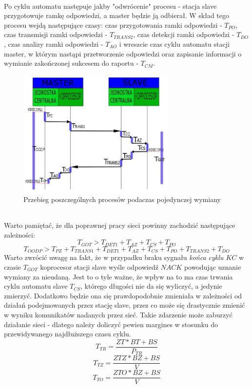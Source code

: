 	\\Po cyklu automatu następuje jakby "odwrócenie" procesu - stacja slave przygotowuje ramkę odpowiedzi, a master będzie ją odbierał. W skład tego procesu wejdą następujące czasy: czas przygotowania ramki odpowiedzi - $ T_{PO} $, czas transmisji ramki odpowiedzi - $ T_{TRANS2} $, czas detekcji ramki odpowiedzi - $ T_{DO} $, czas analizy ramki odpowiedzi - $ T_{AO} $ i wreszcie czas cyklu automatu stacji master, w którym nastąpi przetworzenie odpowiedzi oraz zapisanie informacji o wymianie zakończonej sukcesem do raportu - $ T_{CM} $.\\
	\begin{figure}[h]
		\centering
		\includegraphics[width=0.7\textwidth]{./img/wymiana.jpg}
		\caption{Przebieg poszczególnych procesów podaczas pojedynczej wymiany}
		\label{fig:wymiana}
	\end{figure}
	\\
	Warto pamiętać, że dla poprawnej pracy sieci powinny zachodzić następujące zależności:
	\begin{equation}
		\label{eq:zalTgot}
		T_{GOT} > T_{DET1} + T_{AZ} + T_{CS} + T_{PO}
	\end{equation}
	\begin{equation}
		\label{eq:zalToodp}
		T_{OODP} > T_{PZ} + T_{TRANS1} + T_{DET1} + T_{AZ} + T_{CS} + T_{PO} + T_{TRANS2} + T_{DO}
	\end{equation}
	Warto zwrócić uwagę na fakt, że w przypadku braku sygnału \textit{końca cyklu $ KC $} w czasie $ T_{GOT} $ koprocesor stacji slave wyśle odpowiedź $ NACK $ powodując uznanie wymiany za nieudaną. Jest to o tyle ważne, że wpływ na to ma czas trwania cyklu automatu slave $ T_{CS} $, którego długości nie da się wyliczyć, a jedynie zmierzyć. Dodatkowo będzie ona się prawdopodobnie zmieniała w zależności od działań podejmowanych przez stację slave, przez co może się drastycznie zmienić w wyniku komunikatów nadanych przez sieć. Takie zdarzenie może zaburzyć działanie sieci - dlatego należy doliczyć pewien margines w stosunku do przewidywanego najdłuższego czasu cyklu.
	\begin{equation}
		\label{eq:czasTrz}
		T_{TR} = \frac{ZT*BT + BS}{P_{TR}}
	\end{equation}
	\begin{equation}
		\label{eq:czasTz}
		T_{TZ} = \frac{ZTZ*BZ + BS}{V}
	\end{equation}
	\begin{equation}
		\label{eq:czasTo}
		T_{TO} = \frac{ZTO*BZ+BS}{V}
	\end{equation}